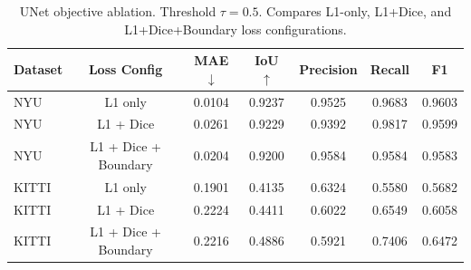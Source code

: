 \begin{table}[H]
  \centering
  \caption{UNet objective ablation. Threshold $\tau=0.5$. Compares L1-only, L1+Dice, and L1+Dice+Boundary loss configurations.}
  \label{\unetObjectiveLabel}
  \begin{tabular}{lcccccc}
    \toprule
    Dataset & Loss Config & MAE $\downarrow$ & IoU $\uparrow$ & Precision & Recall & F1 \\ 
    \midrule
    NYU & L1 only & 0.0104 & 0.9237 & 0.9525 & 0.9683 & 0.9603 \\
    NYU & L1 + Dice & 0.0261 & 0.9229 & 0.9392 & 0.9817 & 0.9599 \\
    NYU & L1 + Dice + Boundary & 0.0204 & 0.9200 & 0.9584 & 0.9584 & 0.9583 \\
    KITTI & L1 only & 0.1901 & 0.4135 & 0.6324 & 0.5580 & 0.5682 \\
    KITTI & L1 + Dice & 0.2224 & 0.4411 & 0.6022 & 0.6549 & 0.6058 \\
    KITTI & L1 + Dice + Boundary & 0.2216 & 0.4886 & 0.5921 & 0.7406 & 0.6472 \\
    \bottomrule
  \end{tabular}
\end{table}
